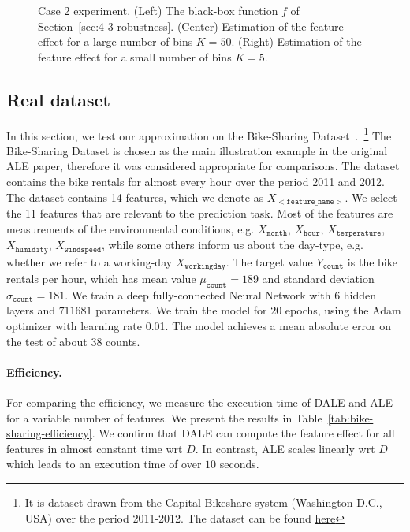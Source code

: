 \documentclass[wcp]{jmlr}
\begin{document}
\begin{figure}[h]
  \begin{center}
    \resizebox{.33\columnwidth}{!}{}
    \resizebox{.32\columnwidth}{!}{}
    \resizebox{.32\columnwidth}{!}{}
  \end{center}
  \caption[Case 2]{Case 2 experiment. (Left) The black-box function
    \(f\) of Section~\ref{sec:4-3-robustness}. (Center) Estimation of
    the feature effect for a large number of bins \(K=50\). (Right)
    Estimation of the feature effect for a small number of bins
    \(K=5\).}
  \label{fig:example-2-samples}
\end{figure}


\subsection{Real dataset}
\label{sec:5-2-real-datasets}
In this section, we test our approximation on the Bike-Sharing
Dataset~\cite{BikeSharing}.~\footnote{It is dataset drawn from the
  Capital Bikeshare system (Washington D.C., USA) over the period
  2011-2012. The dataset can be found
  \href{https://archive.ics.uci.edu/ml/machine-learning-databases/00275/Bike-Sharing-Dataset.zip}{here}}
The Bike-Sharing Dataset is chosen as the main illustration example in
the original ALE paper, therefore it was considered appropriate for
comparisons. The dataset contains the bike rentals for almost every
hour over the period 2011 and 2012. The dataset contains 14 features,
which we denote as \( X_{\mathtt{<feature\_name>}} \). We select the
11 features that are relevant to the prediction task. Most of the
features are measurements of the environmental conditions, e.g.
\(X_{\mathtt{month}}\), \(X_{\mathtt{hour}}\),
\(X_{\mathtt{temperature}}\), \(X_{\mathtt{humidity}}\),
\(X_{\mathtt{windspeed}}\), while some others inform us about the
day-type, e.g. whether we refer to a working-day
\(X_{\mathtt{workingday}}\). The target value \( Y_{\mathtt{count}}\)
is the bike rentals per hour, which has mean value
\(\mu_{\mathtt{count}} = 189\) and standard deviation
\(\sigma_{\mathtt{count}} = 181\). We train a deep fully-connected
Neural Network with 6 hidden layers and \(711681\) parameters. We
train the model for \(20\) epochs, using the Adam optimizer with
learning rate 0.01. The model achieves a mean absolute error on the
test of about \(38\) counts.

\paragraph{Efficiency.} For comparing the efficiency, we measure the
execution time of DALE and ALE for a variable number of features. We
present the results in Table~\ref{tab:bike-sharing-efficiency}. We
confirm that DALE can compute the feature effect for all features in
almost constant time wrt \(D\). In contrast, ALE scales linearly wrt
\(D\) which leads to an execution time of over \(10\) seconds.
\end{document}

